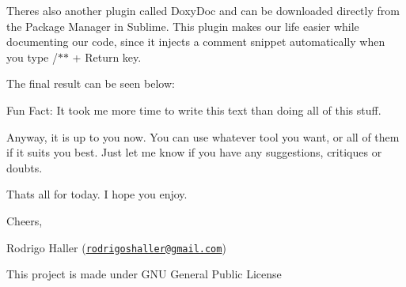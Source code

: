 There\textquotesingle{}s also another plugin called Doxy\+Doc and can be downloaded directly from the Package Manager in Sublime. This plugin makes our life easier while documenting our code, since it injects a comment snippet automatically when you type /$\ast$$\ast$ + Return key. 



The final result can be seen below\+: 

Fun Fact\+: It took me more time to write this text than doing all of this stuff.

Anyway, it is up to you now. You can use whatever tool you want, or all of them if it suits you best. Just let me know if you have any suggestions, critiques or doubts.

That\textquotesingle{}s all for today. I hope you enjoy.

Cheers,

Rodrigo Haller (\href{mailto:rodrigoshaller@gmail.com}{\tt rodrigoshaller@gmail.\+com})

This project is made under G\+NU General Public License 